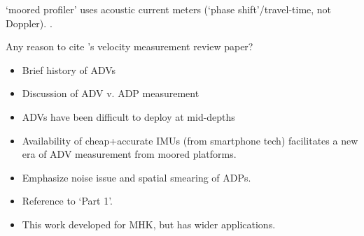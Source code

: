 \cite[]{Doherty++1999} `moored profiler' uses acoustic current meters (`phase shift'/travel-time, not Doppler). \citep[]{Nash++2004,Alford2010}.

Any reason to cite \cite{Williams1996}'s velocity measurement review paper?

\begin{itemize}
\item Brief history of ADVs
\item Discussion of ADV v. ADP measurement
\item ADVs have been difficult to deploy at mid-depths
\item Availability of cheap+accurate IMUs (from smartphone tech) facilitates a new era of ADV measurement from moored platforms.
\item Emphasize noise issue and spatial smearing of ADPs.
\item Reference to `Part 1'.
\item This work developed for MHK, but has wider applications.
\end{itemize}



